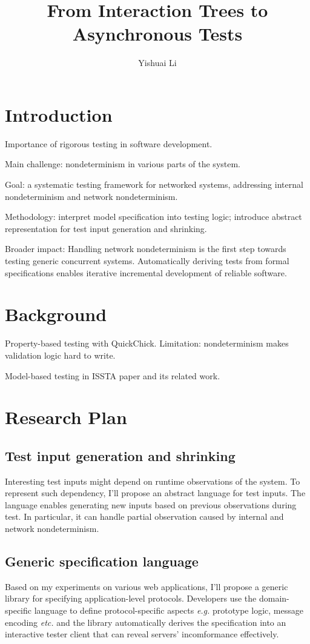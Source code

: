 \documentclass{article}
\title{From Interaction Trees to Asynchronous Tests}
\author{Yishuai Li}
\begin{document}
\maketitle
\section{Introduction}
Importance of rigorous testing in software development.

Main challenge: nondeterminism in various parts of the system.

Goal: a systematic testing framework for networked systems, addressing internal
nondeterminism and network nondeterminism.

Methodology: interpret model specification into testing logic; introduce
abstract representation for test input generation and shrinking.

Broader impact: Handling network nondeterminism is the first step towards
testing generic concurrent systems.  Automatically deriving tests from formal
specifications enables iterative incremental development of reliable software.

\section{Background}
Property-based testing with QuickChick.  Limitation: nondeterminism makes
validation logic hard to write.

Model-based testing in ISSTA paper and its related work.
\section{Research Plan}
\subsection{Test input generation and shrinking}
Interesting test inputs might depend on runtime observations of the system.  To
represent such dependency, I'll propose an abstract language for test inputs.
The language enables generating new inputs based on previous observations during
test.  In particular, it can handle partial observation caused by internal and
network nondeterminism.

\subsection{Generic specification language}
Based on my experiments on various web applications, I'll propose a generic
library for specifying application-level protocols.  Developers use the
domain-specific language to define protocol-specific aspects {\it e.g.}
prototype logic, message encoding {\it etc.}  and the library automatically
derives the specification into an interactive tester client that can reveal
servers' incomformance effectively.
\end{document}
